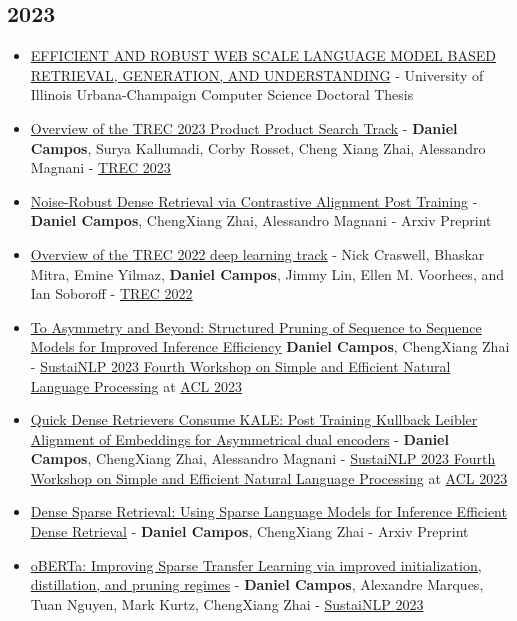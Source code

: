 \documentclass[line,margin]{res}
\begin{document}
\begin{resume}
\subsection{2023}
\begin{itemize}
    \item \href{https://www.ideals.illinois.edu/items/128691}{EFFICIENT AND ROBUST WEB SCALE LANGUAGE MODEL BASED RETRIEVAL, GENERATION, AND UNDERSTANDING} - University of Illinois Urbana-Champaign Computer Science Doctoral Thesis
    \item \href{https://arxiv.org/abs/2311.07861}{Overview of the TREC 2023 Product Product Search Track} - \textbf{Daniel Campos}, Surya Kallumadi, Corby Rosset, Cheng Xiang Zhai, Alessandro Magnani - \href{https://trec.nist.gov/tracks.html}{TREC 2023}
    \item \href{https://arxiv.org/abs/2304.03401}{Noise-Robust Dense Retrieval via Contrastive Alignment Post Training} - \textbf{Daniel Campos}, ChengXiang Zhai, Alessandro Magnani - Arxiv Preprint
    \item \href{https://www.microsoft.com/en-us/research/publication/overview-of-the-trec-2022-deep-learning-track/}{Overview of the TREC 2022 deep learning track} - Nick Craswell, Bhaskar Mitra, Emine Yilmaz, \textbf{Daniel Campos}, Jimmy Lin, Ellen M. Voorhees, and Ian Soboroff - \href{https://trec.nist.gov/tracks.html}{TREC 2022}
    \item \href{https://arxiv.org/abs/2304.02721}{To Asymmetry and Beyond: Structured Pruning of Sequence to Sequence Models for Improved Inference Efficiency}  \textbf{Daniel Campos}, ChengXiang Zhai - \href{https://sites.google.com/view/sustainlp2023/home?authuser=0}{SustaiNLP 2023 
Fourth Workshop on Simple and Efficient Natural Language Processing} at \href{https://2023.aclweb.org/}{ACL 2023} 
    \item \href{https://arxiv.org/abs/2304.01016}{Quick Dense Retrievers Consume KALE: Post Training Kullback Leibler Alignment of Embeddings for Asymmetrical dual encoders} - \textbf{Daniel Campos}, ChengXiang Zhai, Alessandro Magnani - \href{https://sites.google.com/view/sustainlp2023/home?authuser=0}{SustaiNLP 2023 
Fourth Workshop on Simple and Efficient Natural Language Processing} at \href{https://2023.aclweb.org/}{ACL 2023} 
    \item \href{https://arxiv.org/abs/2304.00114}{Dense Sparse Retrieval: Using Sparse Language Models for Inference Efficient Dense Retrieval} - \textbf{Daniel Campos}, ChengXiang Zhai - Arxiv Preprint
    \item \href{https://arxiv.org/abs/2303.17612}{oBERTa: Improving Sparse Transfer Learning via improved initialization, distillation, and pruning regimes} - \textbf{Daniel Campos}, Alexandre Marques, Tuan Nguyen, Mark Kurtz, ChengXiang Zhai - \href{https://sites.google.com/view/sustainlp2023/home?authuser=0}{SustaiNLP 2023 
}
\end{itemize}
\end{resume}
\end{document}
